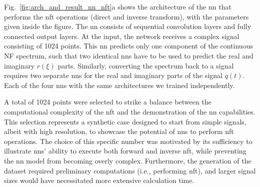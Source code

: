 




Fig.~\ref{fig:arch_and_result_nn_nft}a shows the architecture of the \acrshort{nn} that performs the \acrshort{nft} operations (direct and inverse transform), with the parameters given inside the figure. The \acrshort{nn} consists of sequential convolution layers and fully connected output layers. At the input, the network receives a complex signal consisting of 1024 points. This \acrshort{nn} predicts only one component of the continuous NF spectrum, such that two identical \acrshort{nn}s have to be used to predict the real and imaginary $r(\xi)$ parts. Similarly, converting the spectrum back to a signal requires two separate \acrshort{nn}s for the real and imaginary parts of the signal $q(t)$. Each of the four \acrshort{nn}s with the same architectures we trained independently.

A total of 1024 points were selected to strike a balance between the computational complexity of the \acrlong{nft} and the demonstration of the \acrshort{nn} capabilities. This selection represents a synthetic case designed to start from simple signals, albeit with high resolution, to showcase the potential of \acrshort{nn}s to perform \acrshort{nft} operations. The choice of this specific number was motivated by its sufficiency to illustrate \acrshort{nn}s' ability to execute both forward and inverse \acrshort{nft}, while preventing the \acrshort{nn} model from becoming overly complex. Furthermore, the generation of the dataset required preliminary computations (i.e., performing \acrshort{nft}), and larger signal sizes would have necessitated more extensive calculation time.

